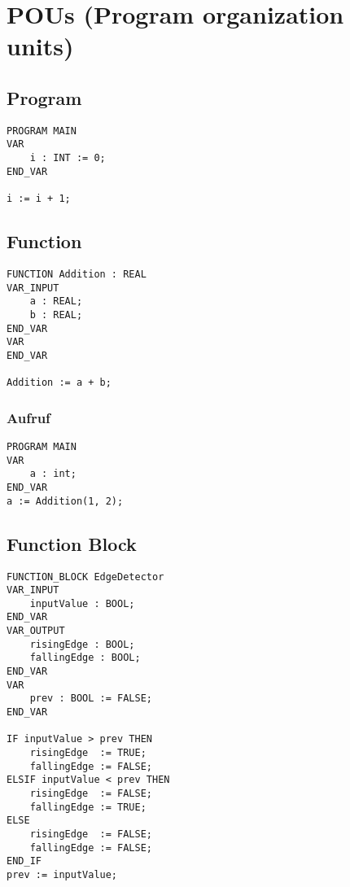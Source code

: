 


\section{POUs (Program organization units)}

\subsection{Program}
\begin{lstlisting}
PROGRAM MAIN
VAR
    i : INT := 0;
END_VAR

i := i + 1;
\end{lstlisting}

\subsection{Function}
\begin{lstlisting}
FUNCTION Addition : REAL
VAR_INPUT
    a : REAL;
    b : REAL;
END_VAR
VAR
END_VAR

Addition := a + b;
\end{lstlisting}

\subsubsection{Aufruf}
\begin{lstlisting}
PROGRAM MAIN
VAR
    a : int;
END_VAR
a := Addition(1, 2);
\end{lstlisting}

\clearpage

\subsection{Function Block}
\begin{lstlisting}
FUNCTION_BLOCK EdgeDetector
VAR_INPUT
    inputValue : BOOL;
END_VAR
VAR_OUTPUT
    risingEdge : BOOL;
    fallingEdge : BOOL;
END_VAR
VAR
    prev : BOOL := FALSE;
END_VAR

IF inputValue > prev THEN
    risingEdge  := TRUE;
    fallingEdge := FALSE;
ELSIF inputValue < prev THEN
    risingEdge  := FALSE;
    fallingEdge := TRUE;
ELSE
    risingEdge  := FALSE;
    fallingEdge := FALSE;
END_IF
prev := inputValue;
\end{lstlisting}
